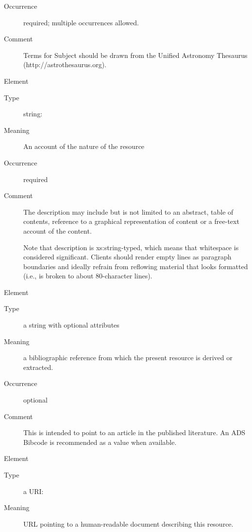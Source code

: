 \documentclass[11pt,a4paper]{ivoa}
\begin{document}
\begin{generated}
\begin{bigdescription}
\begin{description}
\item[Occurrence] required; multiple occurrences allowed.
\item[Comment] 
               Terms for Subject should be drawn from the Unified
               Astronomy Thesaurus (http://astrothesaurus.org).
             

\end{description}
\item[Element \xmlel{description}]
\begin{description}
\item[Type] string: 
\item[Meaning] 
               An account of the nature of the resource
             
\item[Occurrence] required
\item[Comment] 
               The description may include but is not limited to an abstract, 
               table of contents, reference to a graphical representation of
               content or a free-text account of the content.

               Note that description is xs:string-typed, which means that
               whitespace is considered significant.  Clients should
               render empty lines as paragraph boundaries and ideally
               refrain from reflowing material that looks formatted (i.e.,
               is broken to about 80-character lines).
             

\end{description}
\item[Element \xmlel{source}]
\begin{description}
\item[Type] a string with optional attributes
\item[Meaning] 
                a bibliographic reference from which the present resource is 
                derived or extracted.  
             
\item[Occurrence] optional
\item[Comment] 
                This is intended to point to an article in the published 
                literature.  An ADS Bibcode is recommended as a value when 
                available.    
             

\end{description}
\item[Element \xmlel{referenceURL}]
\begin{description}
\item[Type] a URI: 
\item[Meaning] 
                URL pointing to a human-readable document describing this 
                resource.   
             

\end{description}
\end{bigdescription}
\end{generated}
\end{document}
